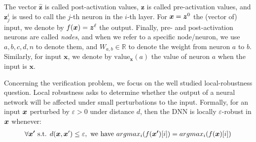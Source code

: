 \documentclass{llncs}
\newcommand{\val}{{\textrm{value}}}
\begin{document}
The vector $\hat{\boldsymbol{z}}$ is called post-activation values, 
$\boldsymbol{z}$ is called pre-activation values, 
and $\boldsymbol{z}^{i}_j$ is used to call the $j$-th neuron in the $i$-th layer. 
For $\boldsymbol{x}={\bm{z}}^0$ the (vector of) input, we denote by $f(\boldsymbol{x})={\bm{z}}^\ell$ the output. Finally, pre- and post-activation neurons are called \emph{nodes}, and when we refer to a specific node/neuron, we use $a,b,c,d,n$ to denote them, and $W_{a,b} \in \mathbb{R}$ to denote the weight from neuron $a$ to $b$. Similarly, for input $\boldsymbol{x}$, we denote by $\val_{\boldsymbol{x}}(a)$ the value of neuron $a$ when the input is $\boldsymbol{x}$. 



\iffalse
and the $i$-th hidden layer is a vector in $\mathbb{R}^{d_i}$, 
and the output layer is a vector in $\mathbb{R}^{d'}$ or a scale. 
The weights, bias and activation functions decide propagate the from previous to the next layer. In formula, from layer $l_{i-1}$ to layer $l_{i}$, the weight 
$\boldsymbol{W}^i$ is matrix of $d_i\times d_{i-1}$, 
the bias is a vector $\vb^i$ in $\mathbb{R}^{d_i}$, and the activation function 
is $\sigma$, then  if the $i-1$-th layer is $\hat{\boldsymbol{z}}^{(i-1)}$, 
then the value of $i$-th layer is computed by: 
\begin{align*}
	{\boldsymbol{z}}^{i} &= \boldsymbol{W}^i\cdot \hat{\boldsymbol{z}}^{(i-1)}+ \vb^i\\
	\hat{\boldsymbol{z}}^{i}(n) &= \sigma({\boldsymbol{z}}^i(n)).
\end{align*} The vector $\hat{\boldsymbol{z}}$ is called post-activation values, and $\boldsymbol{z}$ is called pre-activation values, and $\boldsymbol{z}^{(i)}_j$ is used to call the $j$-th neuron in the $i$-th layer. In our style, we also call neurons \emph{nodes} and use $a,b,c,d$ to denote them. We use $W_{ab}$ to denote the weight from neuron $b$ to $a$. We use $\boldsymbol{x}$ to denote the vector of input and  $f(\boldsymbol{x})$ to denote the output.
\fi

\medskip

Concerning the verification problem, we focus on the well studied local-robustness question. Local robustness asks to determine whether the output of a neural network will be affected under small perturbations to the input. 
Formally, for an input ${\bm{x}}$ perturbed by $\varepsilon >0$ under distance $d$, then the DNN is locally $\varepsilon$-robust in ${\bm{x}}$ whenever:
\begin{align*}
	\forall \boldsymbol{x'} \text{ s.t. } d({\bm{x}},{\bm{x}}')\leq \varepsilon, \text{ we have }  
	argmax_i (f(\boldsymbol{x'})[i]) = argmax_i(f(\boldsymbol{x})[i])
\end{align*} 
\end{document}
